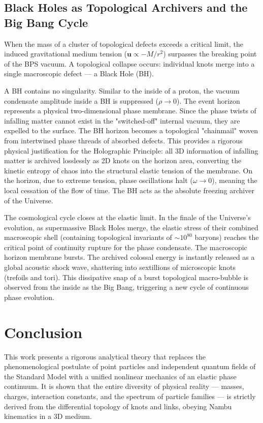 \documentclass[12pt,a4paper]{article}
\begin{document}
\subsection{Black Holes as Topological Archivers and the Big Bang Cycle}
When the mass of a cluster of topological defects exceeds a critical limit, the induced gravitational medium tension ($\mathbf{u} \propto -M/r^2$) surpasses the breaking point of the BPS vacuum. A topological collapse occurs: individual knots merge into a single macroscopic defect — a Black Hole (BH). 

A BH contains no singularity. Similar to the inside of a proton, the vacuum condensate amplitude inside a BH is suppressed ($\rho \to 0$). The event horizon represents a physical two-dimensional phase membrane. Since the phase twists of infalling matter cannot exist in the "switched-off" internal vacuum, they are expelled to the surface. The BH horizon becomes a topological "chainmail" woven from intertwined phase threads of absorbed defects. 
This provides a rigorous physical justification for the Holographic Principle: all 3D information of infalling matter is archived losslessly as 2D knots on the horizon area, converting the kinetic entropy of chaos into the structural elastic tension of the membrane. On the horizon, due to extreme tension, phase oscillations halt ($\omega \to 0$), meaning the local cessation of the flow of time. The BH acts as the absolute freezing archiver of the Universe.

The cosmological cycle closes at the elastic limit. In the finale of the Universe's evolution, as supermassive Black Holes merge, the elastic stress of their combined macroscopic shell (containing topological invariants of $\sim 10^{80}$ baryons) reaches the critical point of continuity rupture for the phase condensate. The macroscopic horizon membrane bursts. The archived colossal energy is instantly released as a global acoustic shock wave, shattering into sextillions of microscopic knots (trefoils and tori). This dissipative snap of a burst topological macro-bubble is observed from the inside as the Big Bang, triggering a new cycle of continuous phase evolution.

\section*{Conclusion}

This work presents a rigorous analytical theory that replaces the phenomenological postulate of point particles and independent quantum fields of the Standard Model with a unified nonlinear mechanics of an elastic phase continuum. 
It is shown that the entire diversity of physical reality — masses, charges, interaction constants, and the spectrum of particle families — is strictly derived from the differential topology of knots and links, obeying Nambu kinematics in a 3D medium. 
\end{document}

